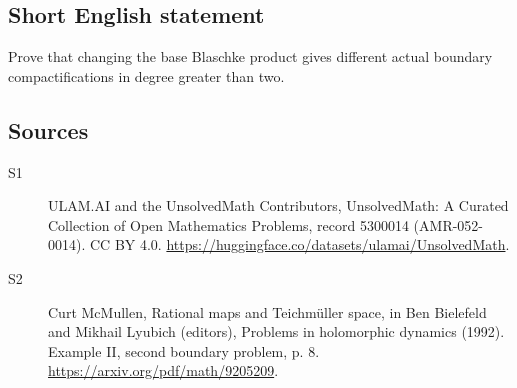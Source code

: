 \documentclass[11pt]{article}
\begin{document}
\subsection{Short English statement}
Prove that changing the base Blaschke product gives different actual boundary compactifications in degree greater than two.
\subsection{Sources}
\begin{description}
\item[\hypertarget{source:5300014:1}{S1}] ULAM.AI and the UnsolvedMath Contributors, UnsolvedMath: A Curated Collection of Open Mathematics Problems, record 5300014 (AMR-052-0014). CC BY 4.0. \url{https://huggingface.co/datasets/ulamai/UnsolvedMath}.
\item[\hypertarget{source:5300014:2}{S2}] Curt McMullen, Rational maps and Teichmüller space, in Ben Bielefeld and Mikhail Lyubich (editors), Problems in holomorphic dynamics (1992). Example II, second boundary problem, p. 8. \url{https://arxiv.org/pdf/math/9205209}.
\end{description}
\label{end:5300014}
\end{document}
